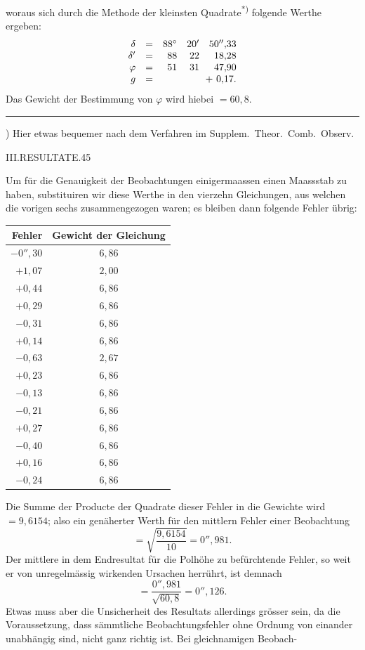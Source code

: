 woraus sich durch die Methode der kleinsten Quadrate\textsuperscript{*)} folgende Werthe ergeben:
\[
\begin{array}{rcrrr}
\delta&=&88^\circ&20'&50''{,}33\\
\delta'&=&88&22&18{,}28\\
\varphi&=&51&31&47{,}90\\
g&=&\multicolumn{3}{r}{+\ 0{,}17.}
\end{array}
\]
Das Gewicht der Bestimmung von $\varphi$ wird hiebei $=60{,}8$.
\par\noindent\rule{.25\textwidth}{.4pt}\par
{\footnotesize *) Hier etwas bequemer nach dem Verfahren im Supplem.\ Theor.\ Comb.\ Observ.\par}

\clearpage
\noindent\mbox{}\hfill III.\quad RESULTATE.\hfill 45\par
Um für die Genauigkeit der Beobachtungen einigermaassen einen Maassstab zu haben, substituiren wir diese Werthe in den vierzehn Gleichungen, aus welchen die vorigen sechs zusammengezogen waren; es bleiben dann folgende Fehler übrig:
\begin{center}
\begin{tabular}{r|c}
Fehler&Gewicht der Gleichung\\\hline
$-0''{,}30$&$6{,}86$\\
$+1{,}07$&$2{,}00$\\
$+0{,}44$&$6{,}86$\\
$+0{,}29$&$6{,}86$\\
$-0{,}31$&$6{,}86$\\
$+0{,}14$&$6{,}86$\\
$-0{,}63$&$2{,}67$\\
$+0{,}23$&$6{,}86$\\
$-0{,}13$&$6{,}86$\\
$-0{,}21$&$6{,}86$\\
$+0{,}27$&$6{,}86$\\
$-0{,}40$&$6{,}86$\\
$+0{,}16$&$6{,}86$\\
$-0{,}24$&$6{,}86$
\end{tabular}
\end{center}
Die Summe der Producte der Quadrate dieser Fehler in die Gewichte wird $=9{,}6154$; also ein genäherter Werth für den mittlern Fehler einer Beobachtung
\[
=\sqrt{\frac{9{,}6154}{10}}=0''{,}981.
\]
Der mittlere in dem Endresultat für die Polhöhe zu befürchtende Fehler, so weit er von unregelmässig wirkenden Ursachen herrührt, ist demnach
\[
=\frac{0''{,}981}{\sqrt{60{,}8}}=0''{,}126.
\]
Etwas muss aber die Unsicherheit des Resultats allerdings grösser sein, da die Voraussetzung, dass sämmtliche Beobachtungsfehler ohne Ordnung von einander unabhängig sind, nicht ganz richtig ist. Bei gleichnamigen Beobach-

